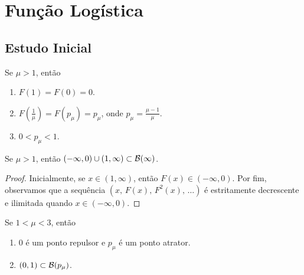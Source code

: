 \section{Função Logística}

\subsection{Estudo Inicial}
\begin{proposition}
Se $\mu > 1$, então
\begin{enumerate}
\item $F(1) = F(0) = 0$.
\item $F(\frac{1}{\mu}) = F(p_\mu) = p_\mu$, onde $p_\mu = \frac{\mu-1}{\mu}$.
\item $0 < p_\mu < 1$.
\end{enumerate}
\end{proposition}

\begin{proposition} \label{prop 2-1}
Se $\mu > 1$, então $(-\infty, 0) \cup (1, \infty) \subset \mathcal{B}(\infty)$.
\end{proposition}

\begin{proof}
Inicialmente, se $x \in (1, \infty)$, então $F(x) \in (-\infty, 0)$. Por fim, observamos que a sequência  $(x,\, F(x),\, F^2(x),\, \dots)$ é estritamente decrescente e ilimitada quando $x \in (-\infty, 0)$.
\newline
\end{proof}

\begin{proposition}
Se $1 < \mu < 3$, então
\begin{enumerate}
\item $0$ é um ponto repulsor e $p_\mu$ é um ponto atrator.
\item $(0, 1) \subset \mathcal{B}(p_\mu)$.
\end{enumerate}
\end{proposition}
